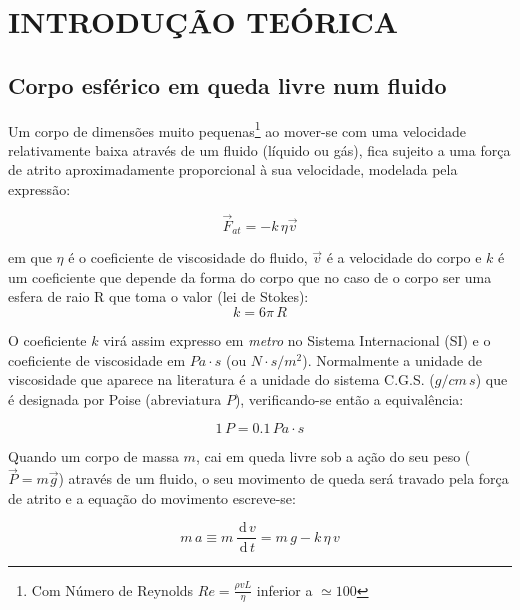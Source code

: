 \documentclass[a4paper,twoside,12pt]{article}      %
\newcommand{\ud}{\,\mathrm{d}}
\begin{document}
\section{\sf INTRODUÇÃO TEÓRICA}
\subsection{\sf Corpo esférico em queda livre num fluido}
Um corpo de dimensões muito pequenas\footnote{Com Número de Reynolds $Re= \frac{\rho v L}{\eta}$ inferior a $\simeq 100$}  ao mover-se com uma velocidade relativamente baixa através de um fluido (líquido ou gás), fica sujeito a uma força de atrito aproximadamente proporcional à sua velocidade, modelada pela expressão:

\begin{equation}
	\label{eq:f_atrito}
	\vec{F}_{at} = - k \, \eta \vec{v}
\end{equation}

em que $\eta$ é o coeficiente de viscosidade do fluido, $\vec{v}$ é a velocidade do corpo e $k$ é um coeficiente que depende da forma do corpo que no caso de o corpo ser uma esfera de raio R que toma o valor (lei de Stokes): 
\begin{equation}
	\label{eq:coef_atrito}
	k = 6 \pi \, R
\end{equation}


O coeficiente $k$ virá assim expresso em \emph{metro} no Sistema Internacional (SI) e o coeficiente de viscosidade em $Pa\cdot s$ (ou $N\cdot s/m^2$).
Normalmente a unidade de viscosidade que aparece na literatura é a unidade do sistema C.G.S. ($g/cm\,s$) que é designada por Poise (abreviatura $P$), verificando-se então a equivalência:

\begin{equation*}
	1 \, P = 0.1\, Pa\cdot s
\end{equation*}

Quando um corpo de massa $m$, cai em queda livre sob a ação do seu peso ($\vec{P}=m\vec{g}$) através de um fluido, o seu movimento de queda será travado pela força de atrito e a equação do movimento escreve-se:

\begin{equation}
	\label{eq:mov}
	m\,a \equiv m\, \frac{\ud\, v}{\ud\, t} =  m\,g - k  \, \eta \, v
\end{equation}
\end{document}
